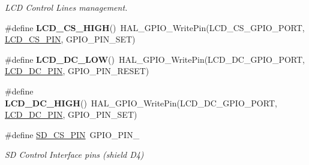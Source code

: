 \begin{DoxyCompactItemize}
\begin{DoxyCompactList}\small\item\em L\+CD Control Lines management. \end{DoxyCompactList}\item 
\mbox{\label{group___s_t_m32_f0_x_x___n_u_c_l_e_o___b_u_s_gaac8fef3913f432c818b6564644b0dd85}} 
\#define {\bfseries L\+C\+D\+\_\+\+C\+S\+\_\+\+H\+I\+GH}()~H\+A\+L\+\_\+\+G\+P\+I\+O\+\_\+\+Write\+Pin(L\+C\+D\+\_\+\+C\+S\+\_\+\+G\+P\+I\+O\+\_\+\+P\+O\+RT, \hyperlink{group___s_t_m32_f0_x_x___n_u_c_l_e_o___b_u_s_ga50d72083b1ed4dd0bc2eaabb4a0332c8}{L\+C\+D\+\_\+\+C\+S\+\_\+\+P\+IN}, G\+P\+I\+O\+\_\+\+P\+I\+N\+\_\+\+S\+ET)
\item 
\mbox{\label{group___s_t_m32_f0_x_x___n_u_c_l_e_o___b_u_s_gaf196d5f2efab55f6e8e95227b8b82729}} 
\#define {\bfseries L\+C\+D\+\_\+\+D\+C\+\_\+\+L\+OW}()~H\+A\+L\+\_\+\+G\+P\+I\+O\+\_\+\+Write\+Pin(L\+C\+D\+\_\+\+D\+C\+\_\+\+G\+P\+I\+O\+\_\+\+P\+O\+RT, \hyperlink{group___s_t_m32_f0_x_x___n_u_c_l_e_o___b_u_s_ga402d8ccd0bb0a6cc377222e75b8e050e}{L\+C\+D\+\_\+\+D\+C\+\_\+\+P\+IN}, G\+P\+I\+O\+\_\+\+P\+I\+N\+\_\+\+R\+E\+S\+ET)
\item 
\mbox{\label{group___s_t_m32_f0_x_x___n_u_c_l_e_o___b_u_s_ga5b26bcb5a9168803f8561739d195aa80}} 
\#define {\bfseries L\+C\+D\+\_\+\+D\+C\+\_\+\+H\+I\+GH}()~H\+A\+L\+\_\+\+G\+P\+I\+O\+\_\+\+Write\+Pin(L\+C\+D\+\_\+\+D\+C\+\_\+\+G\+P\+I\+O\+\_\+\+P\+O\+RT, \hyperlink{group___s_t_m32_f0_x_x___n_u_c_l_e_o___b_u_s_ga402d8ccd0bb0a6cc377222e75b8e050e}{L\+C\+D\+\_\+\+D\+C\+\_\+\+P\+IN}, G\+P\+I\+O\+\_\+\+P\+I\+N\+\_\+\+S\+ET)
\item 
\mbox{\label{group___s_t_m32_f0_x_x___n_u_c_l_e_o___b_u_s_ga04d57a6c18b2d5e81f31093e58ed0c62}} 
\#define \hyperlink{group___s_t_m32_f0_x_x___n_u_c_l_e_o___b_u_s_ga04d57a6c18b2d5e81f31093e58ed0c62}{S\+D\+\_\+\+C\+S\+\_\+\+P\+IN}~G\+P\+I\+O\+\_\+\+P\+I\+N\+\_
\begin{DoxyCompactList}\small\item\em SD Control Interface pins (shield D4) \end{DoxyCompactList}\item 
\mbox{\label{group___s_t_m32_f0_x_x___n_u_c_l_e_o___b_u_s_gaaaff9bd4922137edd642571ec1cafda3}} 

\end{DoxyCompactItemize}
